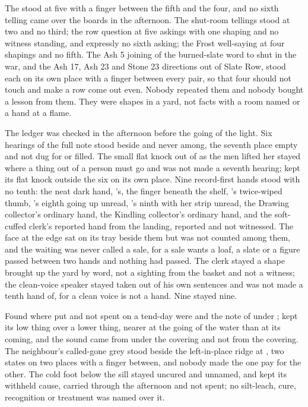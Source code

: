 \scenebreak

The  stood at five with a finger between the fifth and the four, and no sixth telling came over the boards in the afternoon. The shut-room tellings stood at two and no third; the row question at five askings with one shaping and no witness standing, and expressly no sixth asking; the Frost well-saying at four shapings and no fifth. The Ash 5 joining of the burned-slate word to  shut in the war, and the Ash 17, Ash 23 and Stone 23 directions out of Slate Row, stood each on its own place with a finger between every pair, so that four should not touch and make a row come out even. Nobody repeated them and nobody bought a lesson from them. They were shapes in a yard, not facts with a room named or a hand at a flame.

The ledger was checked in the afternoon before the going of the light. Six hearings of the full note stood beside and never among, the seventh place empty and not dug for or filled. The small flat knock out of  as the men lifted her stayed where a thing out of a person must go and was not made a seventh hearing;  kept its flat knock outside the six on its own place. Nine record-first hands stood with no tenth: the neat dark hand, 's, the finger beneath the shelf, 's twice-wiped thumb, 's eighth going up unread, 's ninth with her strip unread, the Drawing collector's ordinary hand, the Kindling collector's ordinary hand, and the soft-cuffed clerk's reported hand from the landing, reported and not witnessed. The face at the edge sat on its tray beside them but was not counted among them, and the waiting was never called a sale, for a sale wants a loaf, a slate or a figure passed between two hands and nothing had passed. The clerk stayed a shape brought up the yard by word, not a sighting from the basket and not a witness; the clean-voice speaker stayed taken out of his own sentences and was not made a tenth hand of, for a clean voice is not a hand. Nine stayed nine.

Found where put and not spent on a tend-day were  and the note of  under ;  kept its low thing over a lower thing, nearer at the going of the water than at its coming, and the sound came from under the covering and not from the covering. The neighbour's called-gone grey stood beside the left-in-place ridge at , two states on two places with a finger between, and nobody made the one pay for the other. The cold foot below the sill stayed uncured and unnamed, and  kept its withheld cause, carried through the afternoon and not spent; no silt-leach, cure, recognition or treatment was named over it.

